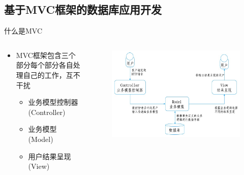 \subsection{基于MVC框架的数据库应用开发}

\begin{frame}{什么是MVC}
\begin{columns}
\begin{column}{0.4\textwidth}
\begin{itemize}
    \item MVC框架包含三个部分每个部分各自处理自己的工作，互不干扰
    \begin{itemize}
        \item 业务模型控制器 (Controller)
        \item 业务模型 (Model)
        \item 用户结果呈现 (View)
    \end{itemize}
\end{itemize}
\end{column}

\begin{column}{0.6\textwidth}
\begin{figure}
    \centering
    \includegraphics[width=\textwidth]{figure/fig-15.jpg}
\end{figure}
\end{column}

\end{columns}
\end{frame}


